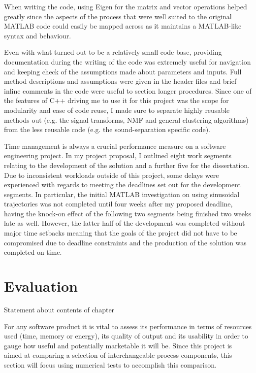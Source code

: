\documentclass[10pt,twoside,a4paper]{report}
\begin{document}
When writing the code, using Eigen for the matrix and vector operations helped greatly since the aspects of the process that were well suited to the original MATLAB code could easily be mapped across as it maintains a MATLAB-like syntax and behaviour.

Even with what turned out to be a relatively small code base, providing documentation during the writing of the code was extremely useful for navigation and keeping check of the assumptions made about parameters and inputs. Full method descriptions and assumptions were given in the header files and brief inline comments in the code were useful to section longer procedures. Since one of the features of C++ driving me to use it for this project was the scope for modularity and ease of code reuse, I made sure to separate highly reusable methods out (e.g. the signal transforms, NMF and general clustering algorithms) from the less reusable code (e.g. the sound-separation specific code).

Time management is always a crucial performance measure on a software engineering project. In my project proposal, I outlined eight work segments relating to the development of the solution and a further five for the dissertation. Due to inconsistent workloads outside of this project, some delays were experienced with regards to meeting the deadlines set out for the development segments. In particular, the initial MATLAB investigation on using sinusoidal trajectories was not completed until four weeks after my proposed deadline, having the knock-on effect of the following two segments being finished two weeks late as well. However, the latter half of the development was completed without major time setbacks meaning that the goals of the project did not have to be compromised due to deadline constraints and the production of the solution was completed on time.

\chapter{Evaluation}

Statement about contents of chapter

For any software product it is vital to assess its performance in terms of resources used (time, memory or energy), its quality of output and its usability in order to gauge how useful and potentially marketable it will be. Since this project is aimed at comparing a selection of interchangeable process components, this section will focus using numerical tests to accomplish this comparison.
\end{document}

